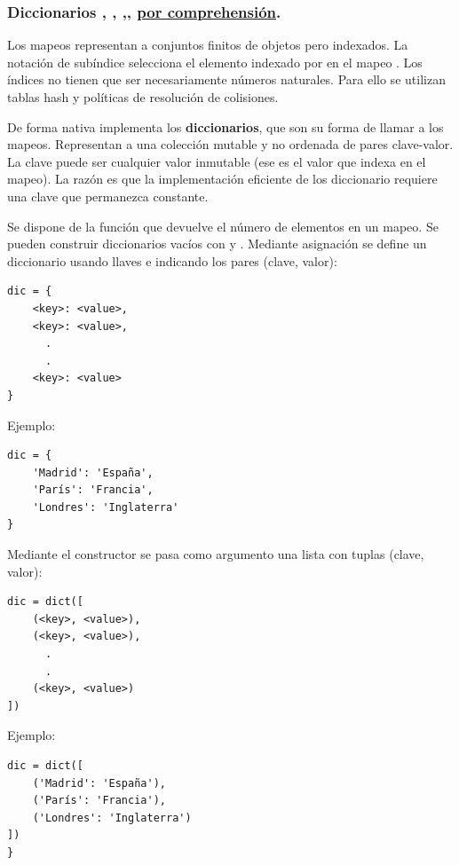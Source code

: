 \subsubsection*{Diccionarios  \cm{\{\}}, ,  ,, \underline{por comprehensión}.}

Los mapeos representan a conjuntos finitos de objetos pero indexados. La notación de subíndice  selecciona el elemento indexado por  en el mapeo . Los índices no tienen que ser necesariamente números naturales. Para ello se utilizan tablas hash y políticas de resolución de colisiones.

De forma nativa  implementa los \textbf{diccionarios}, que son su forma de llamar a los mapeos. Representan a una colección mutable y no ordenada de pares clave-valor. La clave puede ser cualquier valor inmutable (ese es el valor que indexa en el mapeo). La razón es que la implementación eficiente de los diccionario requiere una clave que permanezca constante. 

Se dispone de la función  que devuelve el número de elementos en un mapeo.
Se pueden construir diccionarios vacíos con \cm{\{\}} y  .  Mediante asignación se define un diccionario usando llaves e indicando los pares (clave, valor):

\hfil
\begin{minipage}{.3\textwidth}
\begin{Verbatim}[frame=single]
dic = {
    <key>: <value>,
    <key>: <value>,
      .
      .
    <key>: <value>
}
\end{Verbatim}
\end{minipage}
\hspace{1cm}
\begin{minipage}{.3\textwidth}
Ejemplo:
\begin{Verbatim}
dic = {
    'Madrid': 'España',
    'París': 'Francia',
    'Londres': 'Inglaterra'
}
\end{Verbatim}
\end{minipage}

Mediante el constructor se pasa como argumento una lista con tuplas (clave, valor):

\hfil
\begin{minipage}{.3\textwidth}
\begin{Verbatim}[frame=single]
dic = dict([
    (<key>, <value>),
    (<key>, <value>),
      .
      .
    (<key>, <value>)
])
\end{Verbatim}
\end{minipage}
\hspace{1cm}
\begin{minipage}{.3\textwidth}
Ejemplo:
\begin{Verbatim}
dic = dict([
    ('Madrid': 'España'),
    ('París': 'Francia'),
    ('Londres': 'Inglaterra')
])
}
\end{Verbatim}
\end{minipage}

